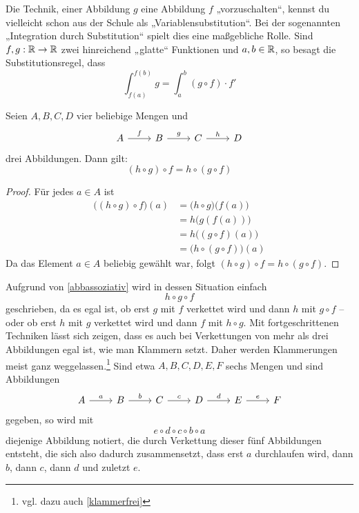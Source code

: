 \begin{vorschau}
    Die Technik, einer Abbildung $g$ eine Abbildung $f$ „vorzuschalten“, kennst du vielleicht schon aus der Schule als „Variablensubstitution“. Bei der sogenannten „Integration durch Substitution“ spielt dies eine maßgebliche Rolle. Sind $f,g:\mathbb R\to \mathbb R$ zwei hinreichend „glatte“ Funktionen und $a,b\in \mathbb R$, so besagt die Substitutionsregel, dass
        \[ \int_{f(a)}^{f(b)} g = \int_a^b (g\circ f) \cdot f' \]
\end{vorschau}


\begin{satz} \label{abbassoziativ}
    Seien $A,B,C,D$ vier beliebige Mengen und
    \[\begin{tikzcd}
        A \ar[r, "f"] & B \ar[r, "g"] & C \ar[r, "h"] & D
    \end{tikzcd}\]
    drei Abbildungen. Dann gilt:
        \[ (h\circ g)\circ f = h\circ (g\circ f)\]
\end{satz}
\begin{proof}
    Für jedes $a \in A$ ist
    \begin{align*}
        \bigl((h \circ g) \circ f\bigr) (a)	& = \bigl(h \circ g\bigr) \bigl(f(a)\bigr) \\
        & = h\bigl(g(f(a))\bigr) \\
        & = h\bigl((g \circ f)(a)\bigr) \\
        & = \bigl(h \circ (g \circ f)\bigr)(a)
    \end{align*}
    Da das Element $a\in A$ beliebig gewählt war, folgt $(h\circ g)\circ f = h\circ (g\circ f)$.
\end{proof}


\begin{bem} \label{abbklammerfrei}
    Aufgrund von \cref{abbassoziativ} wird in dessen Situation einfach
        \[ h\circ g\circ f \]
    geschrieben, da es egal ist, ob erst $g$ mit $f$ verkettet wird und dann $h$ mit $g\circ f$ -- oder ob erst $h$ mit $g$ verkettet wird und dann $f$ mit $h\circ g$. Mit fortgeschrittenen Techniken lässt sich zeigen, dass es auch bei Verkettungen von mehr als drei Abbildungen egal ist, wie man Klammern setzt. Daher werden Klammerungen meist ganz weggelassen.\footnote{vgl. dazu auch \cref{klammerfrei}} Sind etwa $A,B,C,D,E,F$ sechs Mengen und sind Abbildungen
    \[\begin{tikzcd}
        A \ar[r, "a"] & B \ar[r, "b"] & C \ar[r, "c"] & D \ar[r, "d"] & E \ar[r, "e"] & F
    \end{tikzcd}\]
    gegeben, so wird mit
        \[ e\circ d\circ c\circ b\circ a \]
    diejenige Abbildung notiert, die durch Verkettung dieser fünf Abbildungen entsteht, die sich also dadurch zusammensetzt, dass erst $a$ durchlaufen wird, dann $b$, dann $c$, dann $d$ und zuletzt $e$.
\end{bem}





